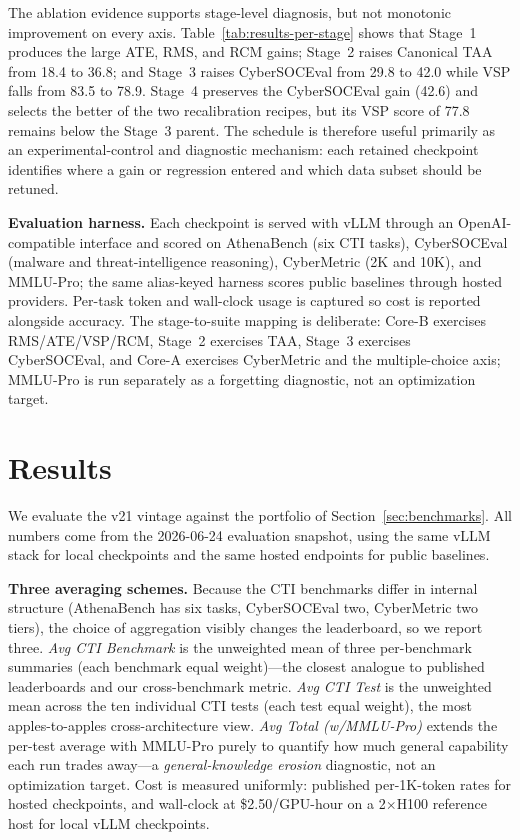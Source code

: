 \documentclass[conference]{IEEEtran}
\begin{document}
The ablation evidence supports stage-level diagnosis, but not monotonic improvement on every axis. Table~\ref{tab:results-per-stage} shows that Stage~1 produces the large ATE, RMS, and RCM gains; Stage~2 raises Canonical TAA from 18.4 to 36.8; and Stage~3 raises CyberSOCEval from 29.8 to 42.0 while VSP falls from 83.5 to 78.9. Stage~4 preserves the CyberSOCEval gain (42.6) and selects the better of the two recalibration recipes, but its VSP score of 77.8 remains below the Stage~3 parent. The schedule is therefore useful primarily as an experimental-control and diagnostic mechanism: each retained checkpoint identifies where a gain or regression entered and which data subset should be retuned.

\textbf{Evaluation harness.} Each checkpoint is served with vLLM through an OpenAI-compatible interface \cite{kwon2023vllm} and scored on AthenaBench (six CTI tasks), CyberSOCEval (malware and threat-intelligence reasoning), CyberMetric (2K and 10K), and MMLU-Pro; the same alias-keyed harness scores public baselines through hosted providers. Per-task token and wall-clock usage is captured so cost is reported alongside accuracy. The stage-to-suite mapping is deliberate: Core-B exercises RMS/ATE/VSP/RCM, Stage~2 exercises TAA, Stage~3 exercises CyberSOCEval, and Core-A exercises CyberMetric and the multiple-choice axis; MMLU-Pro is run separately as a forgetting diagnostic, not an optimization target.

\section{Results}
\label{sec:results}

We evaluate the v21 vintage against the portfolio of Section~\ref{sec:benchmarks}. All numbers come from the 2026-06-24 evaluation snapshot, using the same vLLM stack for local checkpoints and the same hosted endpoints for public baselines.

\textbf{Three averaging schemes.} Because the CTI benchmarks differ in internal structure (AthenaBench has six tasks, CyberSOCEval two, CyberMetric two tiers), the choice of aggregation visibly changes the leaderboard, so we report three. \emph{Avg CTI Benchmark} is the unweighted mean of three per-benchmark summaries (each benchmark equal weight)---the closest analogue to published leaderboards and our cross-benchmark metric. \emph{Avg CTI Test} is the unweighted mean across the ten individual CTI tests (each test equal weight), the most apples-to-apples cross-architecture view. \emph{Avg Total (w/MMLU-Pro)} extends the per-test average with MMLU-Pro \cite{wang2024mmlupro} purely to quantify how much general capability each run trades away---a \textit{general-knowledge erosion} diagnostic, not an optimization target. Cost is measured uniformly: published per-1K-token rates for hosted checkpoints, and wall-clock at \$2.50/GPU-hour on a 2$\times$H100 reference host for local vLLM checkpoints.
\end{document}
